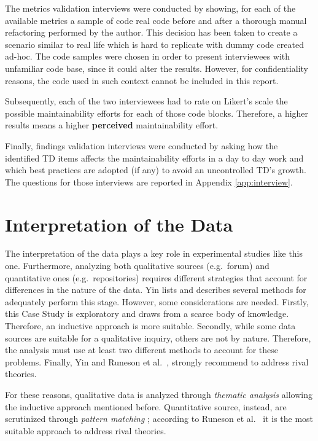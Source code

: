 The metrics validation interviews were conducted by showing, for each of the available metrics a sample of code real code before and after a thorough manual refactoring performed by the author. This decision has been taken to create a scenario similar to real life which is hard to replicate with dummy code created ad-hoc. The code samples were chosen in order to present interviewees with unfamiliar code base, since it could alter the results. However, for confidentiality reasons, the code used in such context cannot be included in this report.

Subsequently, each of the two interviewees had to rate on Likert's scale the possible maintainability efforts for each of those code blocks. Therefore, a higher results means a higher \textbf{perceived} maintainability effort.

Finally, findings validation interviews were conducted by asking how the identified TD items affects the maintainability efforts in a day to day work and which best practices are adopted (if any) to avoid an uncontrolled TD's growth. The questions for those interviews are reported in Appendix \ref{app:interview}.
%
%
%
%


%
%
%
%
\section{Interpretation of the Data} \label{data_interpretation}

The interpretation of the data plays a key role in experimental studies like this one. Furthermore, analyzing both qualitative sources (e.g.\ forum) and quantitative ones (e.g.\ repositories) requires different strategies that account for differences in the nature of the data. Yin \cite{case_study_guide} lists and describes several methods for adequately perform this stage. However, some considerations are needed. Firstly, this Case Study is exploratory and draws from a scarce body of knowledge. Therefore, an inductive approach is more suitable. Secondly, while some data sources are suitable for a qualitative inquiry, others are not by nature. Therefore, the analysis must use at least two different methods to account for these problems. Finally, Yin \cite{case_study_guide} and Runeson et al.\ \cite{case_study_software_engineering}, strongly recommend to address rival theories.

For these reasons, qualitative data is analyzed through \textit{thematic analysis} \cite{qualitative_inquiry} allowing the inductive approach mentioned before. Quantitative source, instead, are scrutinized through \textit{pattern matching} \cite{case_study_guide}; according to Runeson et al.\ \cite{case_study_software_engineering} it is the most suitable approach to address rival theories.

